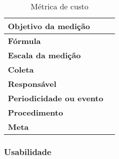 \begin{table}[H]
\centering
\begin{tabular}{|p{4cm}|p{5cm}|}
\hline
	\textbf{Objetivo da medição} &

	\\ \hline
	\textbf{Fórmula} &

	\\ \hline
	\textbf{Escala da medição} &

	\\ \hline
	\textbf{Coleta} &

	\\ \hline
	\textbf{Responsável} &

	\\ \hline
	\textbf{Periodicidade ou evento} &

	\\ \hline
	\textbf{Procedimento} &

	\\ \hline
  \textbf{Meta} &

  \\ \hline
\end{tabular}
\caption{Métrica de custo}
\label{tab:métrica_de_custo}
\end{table}


\subsubsection{Usabilidade}

